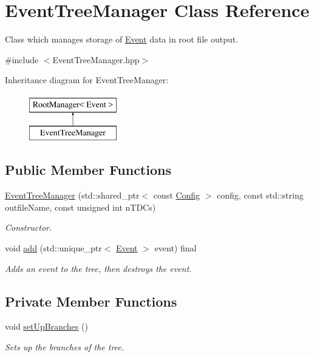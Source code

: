 \hypertarget{class_event_tree_manager}{}\section{Event\+Tree\+Manager Class Reference}
\label{class_event_tree_manager}


Class which manages storage of \hyperlink{class_event}{Event} data in root file output.  




{\ttfamily \#include $<$Event\+Tree\+Manager.\+hpp$>$}

Inheritance diagram for Event\+Tree\+Manager\+:\begin{figure}[H]
\begin{center}
\leavevmode
\includegraphics[height=2.000000cm]{class_event_tree_manager}
\end{center}
\end{figure}
\subsection*{Public Member Functions}
\begin{DoxyCompactItemize}
\item 
\hyperlink{class_event_tree_manager_ac56641a71c28863d76fcc598ac8e32df}{Event\+Tree\+Manager} (std\+::shared\+\_\+ptr$<$ const \hyperlink{class_config}{Config} $>$ config, const std\+::string outfile\+Name, const unsigned int n\+T\+D\+Cs)
\begin{DoxyCompactList}\small\item\em Constructor. \end{DoxyCompactList}\item 
void \hyperlink{class_event_tree_manager_acabb2f6c8dd0e08375b4cf8bf2c148fd}{add} (std\+::unique\+\_\+ptr$<$ \hyperlink{class_event}{Event} $>$ event) final
\begin{DoxyCompactList}\small\item\em Adds an event to the tree, then destroys the event. \end{DoxyCompactList}\end{DoxyCompactItemize}
\subsection*{Private Member Functions}
\begin{DoxyCompactItemize}
\item 
void \hyperlink{class_event_tree_manager_a11cbe0078aeb3d0fe320bbeec335babc}{set\+Up\+Branches} ()
\begin{DoxyCompactList}\small\item\em Sets up the branches of the tree. \end{DoxyCompactList}\end{DoxyCompactItemize}
